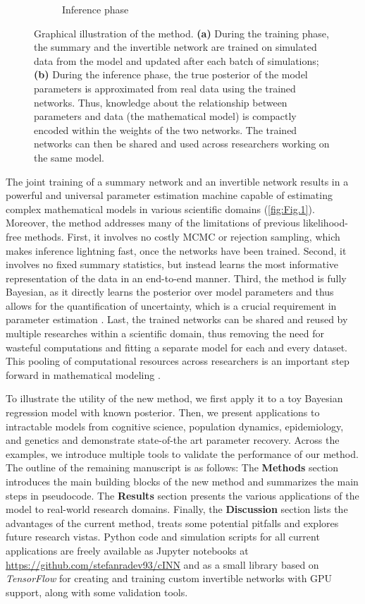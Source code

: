 \documentclass[9pt,twoside,lineno]{pnas-new}
\begin{document}
\begin{figure}
\begin{subfigure}[b]{0.49\textwidth}
    \caption{Inference phase}
    \label{fig:Fig.1b}
  \end{subfigure}
      \caption{Graphical illustration of the method. \textbf{(a)} During the training phase, the summary and the invertible network are trained on simulated data from the model and updated after each batch of simulations; \textbf{(b)} During the inference phase, the true posterior of the model parameters is approximated from real data using the trained networks. Thus, knowledge about the relationship between parameters and data (the mathematical model) is compactly encoded within the weights of the two networks. The trained networks can then be shared and used across researchers working on the same model.} \label{fig:Fig.1}
\end{figure}

The joint training of a summary network and an invertible network results in a powerful and universal parameter estimation machine capable of estimating complex mathematical models in various scientific domains (\autoref{fig:Fig.1}). Moreover, the method addresses many of the limitations of previous likelihood-free methods. First, it involves no costly MCMC or rejection sampling, which makes inference lightning fast, once the networks have been trained. Second, it involves no fixed summary statistics, but instead learns the most informative representation of the data in an end-to-end manner. Third, the method is fully Bayesian, as it directly learns the posterior over model parameters and thus allows for the quantification of uncertainty, which is a crucial requirement in parameter estimation \cite{kendall2017uncertainties, gelman2013bayesian}. Last, the trained networks can be shared and reused by multiple researches within a scientific domain, thus removing the need for wasteful computations and fitting a separate model for each and every dataset. This pooling of computational resources across researchers is an important step forward in mathematical modeling \cite{mestdagh2018prepaid}.

To illustrate the utility of the new method, we first apply it to a toy Bayesian regression model with known posterior. Then, we present applications to intractable models from cognitive science, population dynamics, epidemiology, and genetics and demonstrate state-of-the art parameter recovery. Across the examples, we introduce multiple tools to validate the performance of our method. The outline of the remaining manuscript is as follows: The \textbf{Methods} section introduces the main building blocks of the new method and summarizes the main steps in pseudocode. The \textbf{Results} section presents the various applications of the model to real-world research domains. Finally, the \textbf{Discussion} section lists the advantages of the current method, treats some potential pitfalls and explores future research vistas. Python code and simulation scripts for all current applications are freely available as Jupyter notebooks at \href{https://github.com/stefanradev93/cINN}{https://github.com/stefanradev93/cINN} and as a small library based on \textit{TensorFlow} \cite{abadi2016tensorflow} for creating and training custom invertible networks with GPU support, along with some validation tools. 
\end{document}

